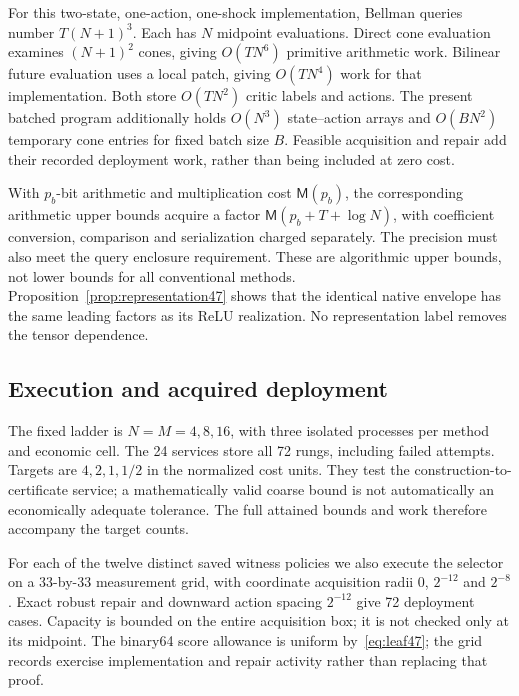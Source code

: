 For this two-state, one-action, one-shock implementation, Bellman queries number $T(N+1)^3$. Each has $N$ midpoint evaluations. Direct cone evaluation examines $(N+1)^2$ cones, giving $O(TN^6)$ primitive arithmetic work. Bilinear future evaluation uses a local patch, giving $O(TN^4)$ work for that implementation. Both store $O(TN^2)$ critic labels and actions. The present batched program additionally holds $O(N^3)$ state--action arrays and $O(BN^2)$ temporary cone entries for fixed batch size $B$. Feasible acquisition and repair add their recorded deployment work, rather than being included at zero cost.

With $p_b$-bit arithmetic and multiplication cost $\mathsf M(p_b)$, the corresponding arithmetic upper bounds acquire a factor $\mathsf M(p_b+T+\log N)$, with coefficient conversion, comparison and serialization charged separately. The precision must also meet the query enclosure requirement. These are algorithmic upper bounds, not lower bounds for all conventional methods. Proposition~\ref{prop:representation47} shows that the identical native envelope has the same leading factors as its ReLU realization. No representation label removes the tensor dependence.

\subsection{Execution and acquired deployment}
The fixed ladder is $N=M=4,8,16$, with three isolated processes per method and economic cell. The 24 services store all 72 rungs, including failed attempts. Targets are $4,2,1,1/2$ in the normalized cost units. They test the construction-to-certificate service; a mathematically valid coarse bound is not automatically an economically adequate tolerance. The full attained bounds and work therefore accompany the target counts.



For each of the twelve distinct saved witness policies we also execute the selector on a $33$-by-$33$ measurement grid, with coordinate acquisition radii $0$, $2^{-12}$ and $2^{-8}$. Exact robust repair and downward action spacing $2^{-12}$ give 72 deployment cases. Capacity is bounded on the entire acquisition box; it is not checked only at its midpoint. The binary64 score allowance is uniform by~\eqref{eq:leaf47}; the grid records exercise implementation and repair activity rather than replacing that proof.


